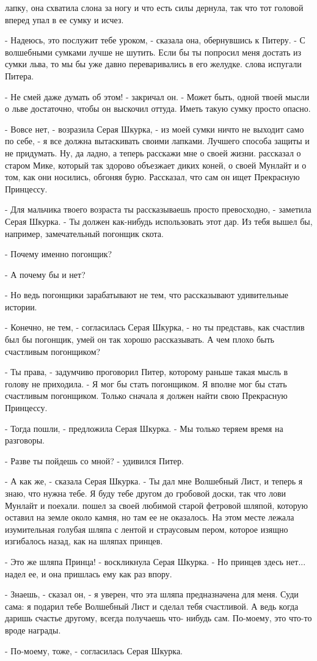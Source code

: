 лапку, она схватила слона за ногу и что есть силы дернула, так что тот 
головой вперед упал в ее сумку и исчез.
\par- Надеюсь, это послужит тебе уроком, - сказала она, обернувшись к 
Питеру. - С волшебными сумками лучше не шутить. Если бы ты попросил 
меня достать из сумки льва, то мы бы уже давно переваривались в его 
желудке.
 слова испугали Питера.
\par- Не смей даже думать об этом! - закричал он. - Может быть, одной 
твоей мысли о льве достаточно, чтобы он выскочил оттуда. Иметь такую 
сумку просто опасно.
\par- Вовсе нет, - возразила Серая Шкурка, - из моей сумки ничто не 
выходит само по себе, - я все должна вытаскивать своими лапками. 
Лучшего способа защиты и не придумать. Ну, да ладно, а теперь расскажи 
мне о своей жизни.
 рассказал о старом Мике, который так здорово объезжает диких 
коней, о своей Мунлайт и о том, как они носились, обгоняя бурю. 
Рассказал, что сам он ищет Прекрасную Принцессу.
\par- Для мальчика твоего возраста ты рассказываешь просто 
превосходно, - заметила Серая Шкурка. - Ты должен как-нибудь 
использовать этот дар. Из тебя вышел бы, например, замечательный 
погонщик скота.
\par- Почему именно погонщик?
\par- А почему бы и нет?
\par- Но ведь погонщики зарабатывают не тем, что рассказывают 
удивительные истории.
\par- Конечно, не тем, - согласилась Серая Шкурка, - но ты представь, 
как счастлив был бы погонщик, умей он так хорошо рассказывать. А чем 
плохо быть счастливым погонщиком?
\par- Ты права, - задумчиво проговорил Питер, которому раньше такая 
мысль в голову не приходила. - Я мог бы стать погонщиком. Я вполне мог 
бы стать счастливым погонщиком. Только сначала я должен найти свою 
Прекрасную Принцессу.
\par- Тогда пошли, - предложила Серая Шкурка. - Мы только теряем время 
на разговоры.
\par- Разве ты пойдешь со мной? - удивился Питер.
\par- А как же, - сказала Серая Шкурка. - Ты дал мне Волшебный Лист, и 
теперь я знаю, что нужна тебе. Я буду тебе другом до гробовой доски, 
так что лови Мунлайт и поехали.
 пошел за своей любимой старой фетровой шляпой, которую 
оставил на земле около камня, но там ее не оказалось. На этом месте 
лежала изумительная голубая шляпа с лентой и страусовым пером, которое 
изящно изгибалось назад, как на шляпах принцев.
\par- Это же шляпа Принца! - воскликнула Серая Шкурка. - Но принцев 
здесь нет...
 надел ее, и она пришлась ему как раз впору.
\par- Знаешь, - сказал он, - я уверен, что эта шляпа предназначена для 
меня. Суди сама: я подарил тебе Волшебный Лист и сделал тебя 
счастливой. А ведь когда даришь счастье другому, всегда получаешь что-
нибудь сам. По-моему, это что-то вроде награды.
\par- По-моему, тоже, - согласилась Серая Шкурка.